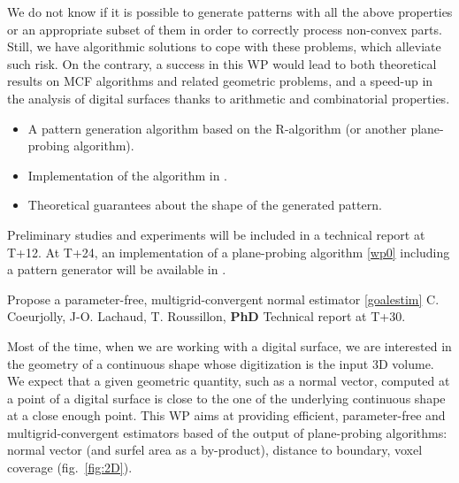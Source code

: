 
\Risks
We do not know if it is possible to generate patterns with all the above properties
or an appropriate subset of them in order to correctly process non-convex parts.
Still, we have algorithmic solutions
\cite{LPRJMIV2017} to cope with these problems, which alleviate such risk. 
On the contrary, a success in this WP would lead to both theoretical results
on MCF algorithms and related geometric problems, and a speed-up in the analysis
of digital surfaces thanks to arithmetic and combinatorial properties.  

\Success
\begin{itemize}
  \item A pattern generation algorithm based on the R-algorithm (or another plane-probing algorithm).
  \item Implementation of the algorithm in \DGtal.
  \item Theoretical guarantees about the shape of the generated pattern. 
\end{itemize}

Preliminary studies and experiments will be included in a technical report at T+12.
At T+24, an implementation of a plane-probing algorithm \ref{wp0} including a pattern
generator will be available in \DGtal. 




\medskip
{}
   {Propose a parameter-free, multigrid-convergent normal estimator \ref{goalestim}}
   {C. Coeurjolly, J-O. Lachaud, T. Roussillon, \textbf{PhD}}
   {Technical report at T+30.}
\medskip

Most of the time, when we are working with a digital surface, we are 
interested in the geometry of a continuous shape whose digitization is the input 3D volume.
We expect that a given geometric quantity, such as a normal vector, computed at a point of a digital surface
is close to the one of the underlying continuous shape at a close enough point. 
This WP aims at providing efficient, parameter-free and multigrid-convergent estimators based of
the output of plane-probing algorithms: normal vector (and surfel area as a by-product),
distance to boundary, voxel coverage (fig.~\ref{fig:2D}).

